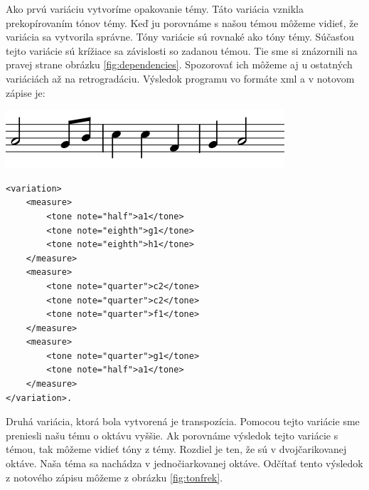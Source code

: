 Ako prvú variáciu vytvoríme opakovanie témy. Táto variácia vznikla prekopírovaním tónov témy. Keď ju porovnáme s našou témou môžeme vidieť, že variácia sa vytvorila správne. Tóny variácie sú rovnaké ako tóny témy. Súčasťou tejto variácie sú krížiace sa závislosti so zadanou témou. Tie sme si znázornili na pravej strane obrázku \ref{fig:dependencies}. Spozorovať ich môžeme aj u ostatných variáciách až na retrogradáciu. Výsledok programu vo formáte xml a v notovom zápise je:

\begin{minipage}{.45\textwidth}
\includegraphics[width=\textwidth]{thesis/obrazky-figures/var1.png}
\end{minipage}%
\begin{minipage}{.5\textwidth}
\centering
\lstset{language=XML}
\begin{lstlisting}[basicstyle=\tiny]
<variation>
    <measure>
        <tone note="half">a1</tone>
        <tone note="eighth">g1</tone>
        <tone note="eighth">h1</tone>
    </measure>
    <measure>
        <tone note="quarter">c2</tone>
        <tone note="quarter">c2</tone>
        <tone note="quarter">f1</tone>
    </measure>
    <measure>
        <tone note="quarter">g1</tone>
        <tone note="half">a1</tone>
    </measure>
</variation>.
\end{lstlisting}
\end{minipage}

Druhá variácia, ktorá bola vytvorená je transpozícia. Pomocou tejto variácie sme preniesli našu tému o oktávu vyššie. Ak porovnáme výsledok tejto variácie s témou, tak môžeme vidieť tóny z témy. Rozdiel je ten, že sú v dvojčarikovanej oktáve. Naša téma sa nachádza v jednočiarkovanej oktáve. Odčítať tento výsledok z notového zápisu môžeme z obrázku \ref{fig:tonfrek}.

